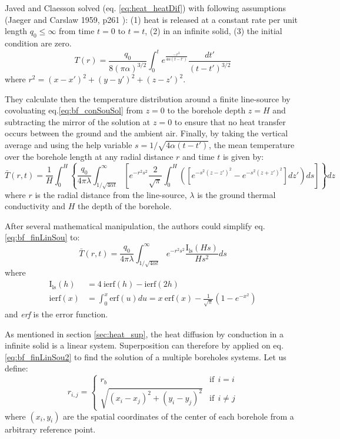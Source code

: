 \documentclass[a4paper,oneside,11pt]{report}
\begin{document}
{Javed and Claesson solved (eq. \ref{eq:heat_heatDif}) with following assumptions (Jaeger and Carslaw 1959, p261 \cite{jae59}): (1) heat is released at a constant rate per unit length $q_0 \leq \infty$ from time $t=0$ to $t=t$, (2) in an infinite solid, (3) the initial condition are zero.
\begin{equation} \label{eq:bf_conSouSol}
	T(r) = \frac{q_0}{8 (\pi \alpha)^{3/2}} \int^t_0 e^{\frac{-r^2}{4 \alpha (t-t')}} \frac{dt'}{(t-t')^{3/2}}
\end{equation}
where $r^2 = (x - x')^2 + (y - y')^2 + (z - z')^2$.

They calculate then the temperature distribution around a finite line-source by covoluating eq.\ref{eq:bf_conSouSol} from $z=0$ to the borehole depth $z=H$ and subtracting the mirror of the solution at $z=0$ to ensure that no heat transfer occurs between the ground and the ambient air. Finally, by taking the vertical average and using the help variable $s=1/\sqrt{4 \alpha(t-t')}$, the mean temperature over the borehole length at any radial distance $r$ and time $t$ is given by:
\begin{equation} \label{eq:bf_finLinSou}
	\bar{T}(r,t) = \frac{1}{H} \int^H_0 \left\{ \frac{q_0}{4 \pi \lambda} \int^\infty_{1/\sqrt{4 \alpha t}} \left[ e^{-r^2 s^2} \frac{2}{\sqrt{\pi}} \int^H_0 \left( \left[ e^{-s^2 (z-z')^2} - e^{-s^2 (z+z')^2} \right] dz' \right) ds \right] \right\} dz
\end{equation} 
where $r$ is the radial distance from the line-source, $\lambda$ is the ground thermal conductivity and $H$ the depth of the borehole.

After several mathematical manipulation, the authors could simplify eq.\ref{eq:bf_finLinSou} to:
\begin{equation} \label{eq:bf_finLinSou2}
	\bar{T}(r,t) = \frac{q_0}{4 \pi \lambda} \int^\infty_{1/\sqrt{4 \alpha t}} e^{-r^2 s^2} \frac{\mathrm{I_{ls}}(H s)}{H s^2} ds
\end{equation} 
where
\begin{align} \label{eq:bf_Ils}
	\mathrm{I_{ls}}(h) 	&= 4 \ \mathrm{ierf}(h) - \mathrm{ierf}(2h) \\
	\mathrm{ierf}(x)	&= \int^x_0 \mathrm{erf}(u) du = x \ \mathrm{erf}(x) - \frac{1}{\sqrt{\pi}}(1-e^{-x^2})
\end{align} 
and \textit{erf} is the error function.

As mentioned in section \ref{sec:heat_sup}, the heat diffusion by conduction in a infinite solid is a linear system. Superposition can therefore by applied on eq.\ref{eq:bf_finLinSou2} to find the solution of a multiple boreholes systems. Let us define:
\begin{equation} \label{eq:bf_rij}
  r_{i,j} = \begin{cases} r_b & \mbox{if} \ \ i = i \\
    \sqrt{(x_i-x_j)^2 + (y_i - y_j)^2} & \mbox{if} \ \ i \neq j   \end{cases}
\end{equation}
where $(x_i,y_i)$ are the spatial coordinates of the center of each borehole from a arbitrary reference point.

}
\end{document}
